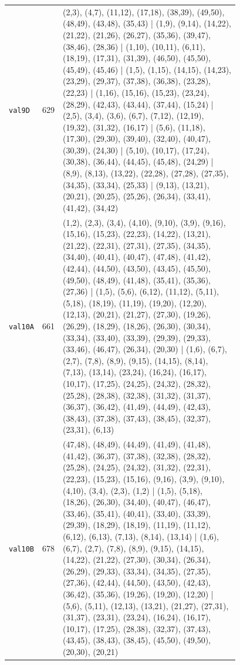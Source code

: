 \begin{landscape}
\begin{longtable}{lr>{\tiny\raggedright\arraybackslash}p{0.78\linewidth}}
\texttt{val9D} & 629 & (2,3), (4,7), (11,12), (17,18), (38,39), (49,50), (48,49), (43,48), (35,43) | (1,9), (9,14), (14,22), (21,22), (21,26), (26,27), (35,36), (39,47), (38,46), (28,36) | (1,10), (10,11), (6,11), (18,19), (17,31), (31,39), (46,50), (45,50), (45,49), (45,46) | (1,5), (1,15), (14,15), (14,23), (23,29), (29,37), (37,38), (36,38), (23,28), (22,23) | (1,16), (15,16), (15,23), (23,24), (28,29), (42,43), (43,44), (37,44), (15,24) | (2,5), (3,4), (3,6), (6,7), (7,12), (12,19), (19,32), (31,32), (16,17) | (5,6), (11,18), (17,30), (29,30), (39,40), (32,40), (40,47), (30,39), (24,30) | (5,10), (10,17), (17,24), (30,38), (36,44), (44,45), (45,48), (24,29) | (8,9), (8,13), (13,22), (22,28), (27,28), (27,35), (34,35), (33,34), (25,33) | (9,13), (13,21), (20,21), (20,25), (25,26), (26,34), (33,41), (41,42), (34,42) \\[2pt]
\texttt{val10A} & 661 & (1,2), (2,3), (3,4), (4,10), (9,10), (3,9), (9,16), (15,16), (15,23), (22,23), (14,22), (13,21), (21,22), (22,31), (27,31), (27,35), (34,35), (34,40), (40,41), (40,47), (47,48), (41,42), (42,44), (44,50), (43,50), (43,45), (45,50), (49,50), (48,49), (41,48), (35,41), (35,36), (27,36) | (1,5), (5,6), (6,12), (11,12), (5,11), (5,18), (18,19), (11,19), (19,20), (12,20), (12,13), (20,21), (21,27), (27,30), (19,26), (26,29), (18,29), (18,26), (26,30), (30,34), (33,34), (33,40), (33,39), (29,39), (29,33), (33,46), (46,47), (26,34), (20,30) | (1,6), (6,7), (2,7), (7,8), (8,9), (9,15), (14,15), (8,14), (7,13), (13,14), (23,24), (16,24), (16,17), (10,17), (17,25), (24,25), (24,32), (28,32), (25,28), (28,38), (32,38), (31,32), (31,37), (36,37), (36,42), (41,49), (44,49), (42,43), (38,43), (37,38), (37,43), (38,45), (32,37), (23,31), (6,13) \\[2pt]
\texttt{val10B} & 678 & (47,48), (48,49), (44,49), (41,49), (41,48), (41,42), (36,37), (37,38), (32,38), (28,32), (25,28), (24,25), (24,32), (31,32), (22,31), (22,23), (15,23), (15,16), (9,16), (3,9), (9,10), (4,10), (3,4), (2,3), (1,2) | (1,5), (5,18), (18,26), (26,30), (34,40), (40,47), (46,47), (33,46), (35,41), (40,41), (33,40), (33,39), (29,39), (18,29), (18,19), (11,19), (11,12), (6,12), (6,13), (7,13), (8,14), (13,14) | (1,6), (6,7), (2,7), (7,8), (8,9), (9,15), (14,15), (14,22), (21,22), (27,30), (30,34), (26,34), (26,29), (29,33), (33,34), (34,35), (27,35), (27,36), (42,44), (44,50), (43,50), (42,43), (36,42), (35,36), (19,26), (19,20), (12,20) | (5,6), (5,11), (12,13), (13,21), (21,27), (27,31), (31,37), (23,31), (23,24), (16,24), (16,17), (10,17), (17,25), (28,38), (32,37), (37,43), (43,45), (38,43), (38,45), (45,50), (49,50), (20,30), (20,21) \\[2pt]

\end{longtable}
\end{landscape}
